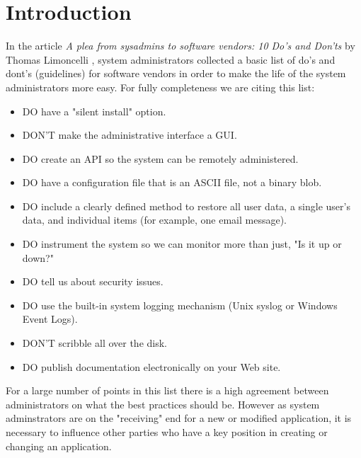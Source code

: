 \section{Introduction} 

In the article \textit{A plea from sysadmins to software vendors: 10 Do's and Don'ts} by Thomas Limoncelli \cite{Limoncelli2011a}, system administrators collected a basic list of do's and dont's (guidelines) for software vendors in order to make the life of the system administrators more easy. For fully completeness we are citing this list:
\begin{itemize}
	\item DO have a "silent install" option.
	\item DON'T make the administrative interface a GUI.
	\item DO create an API so the system can be remotely administered.
	\item DO have a configuration file that is an ASCII file, not a binary blob.
	\item DO include a clearly defined method to restore all user data, a single user's data, and individual items (for example, one email message).
	\item DO instrument the system so we can monitor more than just, "Is it up or down?"
	\item DO tell us about security issues.
	\item DO use the built-in system logging mechanism (Unix syslog or
Windows Event Logs).
	\item DON'T scribble all over the disk.
	\item DO publish documentation electronically on your Web
site.
\end{itemize}

For a large number of points in this list there is a high agreement between administrators on what the best practices should be. However as system adminstrators are on the "receiving" end for a new or modified application, it is necessary to influence other parties who have a key position in creating or changing an application. 

